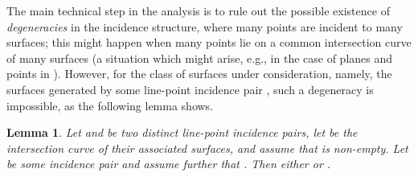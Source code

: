 \documentclass[12pt]{article}
\newtheorem{lemma}[theorem]{Lemma}
\begin{document}
The main technical step in the analysis is to rule out the possible
existence of
{\em degeneracies} in the incidence structure, where many points 
are incident to many surfaces; 
this might happen when many points lie on a common intersection
curve of many surfaces (a situation which might 
arise, e.g., in the case of planes and points in ). 
However, for the class of surfaces under consideration, namely, the
surfaces  generated by some line-point incidence pair
, such a degeneracy is impossible, as the
following lemma shows.
\begin{lemma} \label{lem:gamma}
Let  and  be two distinct line-point
incidence pairs,
let  be the
intersection curve of their associated surfaces, and assume that
 is non-empty.
Let  be some incidence pair and assume further that
.
Then either  or .
\end{lemma}
\end{document}
